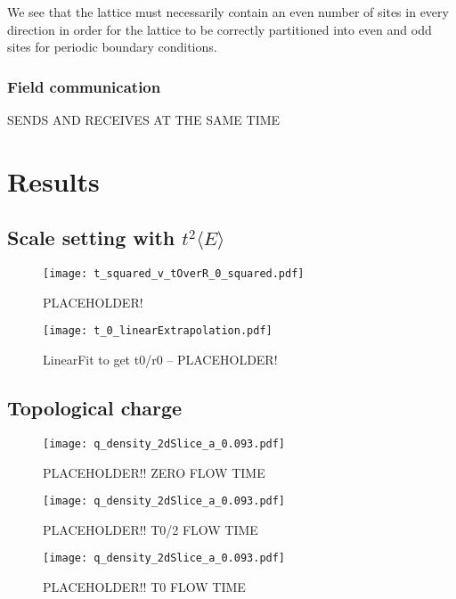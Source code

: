 \documentclass[a4paper,10pt]{article}
\begin{document}
We see that the lattice must necessarily contain an even number of sites in every direction in order for the lattice to be correctly partitioned into even and odd sites for periodic boundary conditions.

\subsubsection{Field communication}
SENDS AND RECEIVES AT THE SAME TIME

\section{Results}

\subsection{Scale setting with $t^2\langle E\rangle$}
\begin{figure}[H]
\centering
\texttt{[image: t\_squared\_v\_tOverR\_0\_squared.pdf]}
\caption[]{PLACEHOLDER!}\label{fig:PLACEHOLDER}
\end{figure}
\begin{figure}[H]
\centering
\texttt{[image: t\_0\_linearExtrapolation.pdf]}
\caption[]{LinearFit to get t0/r0 -- PLACEHOLDER!}\label{fig:PLACEHOLDER}
\end{figure}


\subsection{Topological charge}
\begin{figure}[H]
\centering
\texttt{[image: q\_density\_2dSlice\_a\_0.093.pdf]}
\caption[]{PLACEHOLDER!! ZERO FLOW TIME}\label{fig:PLACEHOLDER}
\end{figure}
\begin{figure}[H]
\centering
\texttt{[image: q\_density\_2dSlice\_a\_0.093.pdf]}
\caption[]{PLACEHOLDER!! T0/2 FLOW TIME}\label{fig:PLACEHOLDER}
\end{figure}
\begin{figure}[H]
\centering
\texttt{[image: q\_density\_2dSlice\_a\_0.093.pdf]}
\caption[]{PLACEHOLDER!! T0 FLOW TIME}\label{fig:PLACEHOLDER}
\end{figure}
\end{document}
